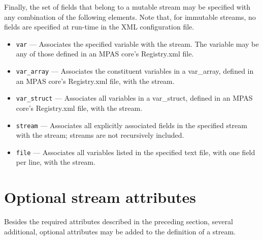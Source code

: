 Finally, the set of fields that belong to a mutable stream may be specified with any combination of the following elements. Note that, for 
immutable streams, no fields are specified at run-time in the XML configuration file.

\begin{itemize}
\item {\tt var} --- Associates the specified variable with the stream. The variable may be any of those defined in an MPAS core's Registry.xml file.
\item {\tt var\_array} --- Associates the constituent variables in a var\_array, defined in an MPAS core's Registry.xml file, with the stream.
\item {\tt var\_struct} --- Associates all variables in a var\_struct, defined in an MPAS core's Registry.xml file, with the stream.
\item {\tt stream} --- Associates all explicitly associated fields in the specified stream with the stream; streams are not recursively included.
\item {\tt file} --- Associates all variables listed in the specified text file, with one field per line, with the stream.
\end{itemize}

\section{Optional stream attributes}
\label{sec:optional_stream_atts} 

Besides the required attributes described in the preceding section, several additional, optional attributes may be added to
the definition of a stream.

